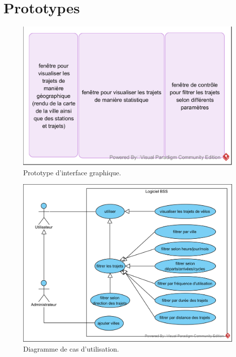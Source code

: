 \documentclass[12pt]{article}
\begin{document}
	\section{Prototypes}
		\begin{figure}[!ht]
		\includegraphics[scale=1.2]{proto_interface1.png}
		\caption{Prototype d'interface graphique.}
		\end{figure}

		\begin{figure}[!ht]
		\includegraphics{use_case_1.png}
		\caption{Diagramme de cas d'utilisation.}
		\end{figure}

	
\end{document}
